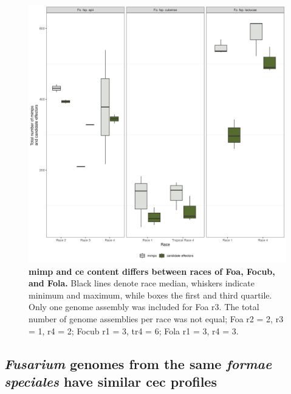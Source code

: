 \begin{figure}[hp!]
    \centering
    \includegraphics[width=\textwidth]{Figures/MimpsAndCandEffs_FspOfInterest.png}
    \caption[Boxplot of \ac{ce} and \ac{mimp} content difference races of \ac{Foa}, \ac{Focub}, and \ac{Fola}.]{\textbf{\Acf{mimp} and \acf{ce} content differs between races of \ac{Foa}, \ac{Focub}, and \ac{Fola}.} Black lines denote race median, whiskers indicate minimum and maximum, while boxes the first and third quartile. Only one genome assembly was included for \ac{Foa} \ac{r3}. The total number of genome assemblies per race was not equal; \ac{Foa} \ac{r2} = 2, \ac{r3} = 1, \ac{r4} = 2; \ac{Focub} \ac{r1} = 3,  \ac{tr4} = 6; \ac{Fola} \ac{r1} = 3, \ac{r4} = 3.}
    \label{fig:MaeiBoxPlot}
\end{figure}

\subsection{\textit{Fusarium} genomes from the same \textit{formae speciales} have similar \acl{cec} profiles}

